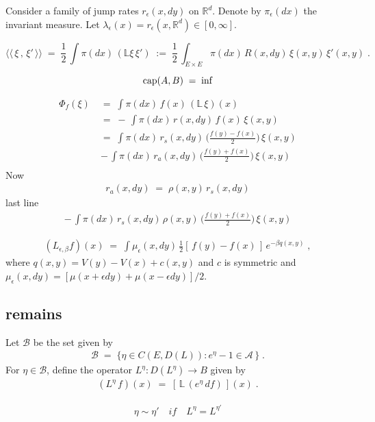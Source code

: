 \documentclass[reqno]{amsart}
\newcounter{as}[section]
\newcommand{\bb}[1]{{\mathbb #1}}
\newcommand{\ms}[1]{{\mathscr #1}}
\newcommand{\<}{\langle}
\renewcommand{\>}{\rangle}
\renewcommand{\Cap}{{\rm cap}}
\begin{document}
\newpage

\smallskip{}

Consider a family of jump rates $r_\epsilon (x,dy)$ on $\bb
R^d$. Denote by $\pi_\epsilon (dx)$ the invariant measure. Let
$\lambda_\epsilon(x) = r_\epsilon (x,\bb R^d) \in [0,\infty]$.

\begin{equation*}
\<\!\<\, \xi \,,\, \xi' \,\>\!\> 
\;=\; \frac 12\, \int \pi(dx)\, (\bb L \xi\, \xi')
\;:=\; \frac 12\, 
\int_{E\times E} \pi(dx)\, R(x,dy) \, \xi(x,y)\, \xi'(x,y) \;.
\end{equation*}

\begin{equation*}
\Cap (A,B) \;=\; \inf
\end{equation*}

\begin{align*}
\Phi_f (\xi) \; & =\; \int \pi(dx)\, f(x)\, (\bb L\, \xi)(x) \\
& =\; -\, \int \pi(dx)\, r(x,dy)\, f(x)\, \xi(x,y) \\
& =\; \int \pi(dx)\, r_s(x,dy)\, \Big( \frac{f(y) - f(x)}2 \Big) \, \xi(x,y) \\
&  -\, \int \pi(dx)\, r_a(x,dy)\, \Big( \frac{f(y) + f(x)}2 \Big) \, \xi(x,y) \\
\end{align*}
Now
\begin{align*}
r_a(x,dy) \;=\; \rho(x,y) \, r_s(x,dy)
\end{align*}
last line
\begin{align*}
-\, \int \pi(dx)\, r_s(x,dy)\, \rho(x,y) \, \Big( \frac{f(y) + f(x)}2 \Big) \, \xi(x,y) 
\end{align*}


\begin{align*}
(L_{\epsilon, \beta} f)(x) \;=\;
\int \mu_\epsilon (x,dy)\, \frac 12 [\, f(y) - f(x)\,] \, e^{-\beta q(x,y)}\;,
\end{align*}
where $q(x,y) = V(y) - V(x) + c(x,y)$ and $c$ is symmetric and
$\mu_\epsilon (x,dy) = [\mu(x + \epsilon dy) + \mu(x - \epsilon dy)]/2$. 
\newpage




\subsection{remains}
Let $\ms B$ be the set given by 
\begin{gather*}
\ms B \;=\; \big\{\eta \in C(E, D(L)) : e^\eta - 1 \in \ms A\, \big\}\;.
\end{gather*}
For $\eta\in\ms B$, define the operator $L^\eta :D(L^\eta) \to B$ given by
\begin{align*}
(L^\eta \, f)(x) \;=\; [\, \bb L\, (e^\eta\, df)\,] (x) \;.
\end{align*}

\begin{align*}
\eta \sim \eta' \quad if \quad L^\eta = L^{\eta'}
\end{align*}


\end{document}
